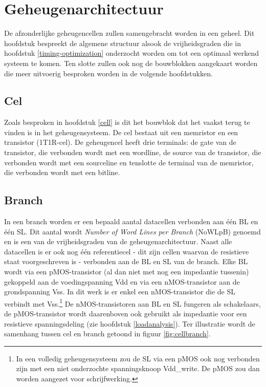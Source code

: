 \chapter{Geheugenarchitectuur}
\label{architecture}
De afzonderlijke geheugencellen zullen samengebracht worden in een geheel.
Dit hoofdstuk bespreekt de algemene structuur alsook de vrijheidsgraden die in hoofdstuk \ref{timing-optimization} onderzocht worden om tot een optimaal werkend systeem te komen. Ten slotte zullen ook nog de bouwblokken aangekaart worden die meer uitvoerig besproken worden in de volgende hoofdstukken. 


\section{Cel}
Zoals besproken in hoofdstuk \ref{cell} is dit het bouwblok dat het vaakst terug te vinden is in het geheugensysteem.
De cel bestaat uit een memristor en een transistor (1T1R-cel). De geheugencel heeft drie terminals: de gate van de transistor, die verbonden wordt met een wordline, de source van de transistor, die verbonden wordt met een sourceline en tenslotte de terminal van de memristor, die verbonden wordt met een bitline.

\section{Branch}
In een branch worden er een bepaald aantal datacellen verbonden aan één BL en één SL. Dit aantal wordt \emph{Number of Word Lines per Branch} (NoWLpB) genoemd en is een van de vrijheidsgraden van de geheugenarchitectuur. Naast alle datacellen is er ook nog één referentiecel - dit zijn cellen waarvan de resistieve staat voorgeschreven is - verbonden aan de BL en SL van de branch.
Elke BL wordt via een pMOS-transistor (al dan niet met nog een impedantie tussenin) gekoppeld aan de voedingspanning Vdd en via een nMOS-transistor aan de grondspanning Vss. In dit werk is er enkel een nMOS-transistor die de SL verbindt met Vss.\footnote{In een volledig geheugensysteem zou de SL via een pMOS ook nog verbonden zijn met een niet onderzochte spanningsknoop Vdd\_write. De pMOS zou dan worden aangezet voor schrijfwerking.} De nMOS-transistoren aan BL en SL fungeren als schakelaars, de pMOS-transistor wordt daarenboven ook gebruikt als impedantie voor een resistieve spanningsdeling (zie hoofdstuk \ref{loadanalysis}).
Ter illustratie wordt de samenhang tussen cel en branch getoond in figuur \ref{fig:cellbranch}.

